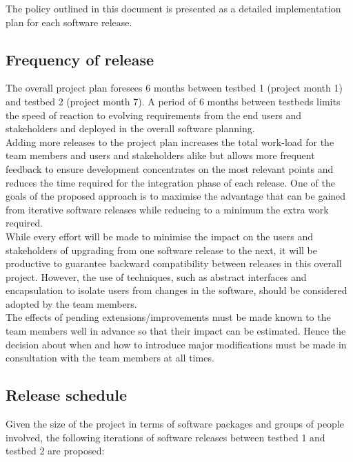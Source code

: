 \noindent The policy outlined in this document is presented as a detailed implementation plan for each software release.

\subsection{Frequency of release}

\noindent The overall project plan foresees 6 months between testbed 1 (project month 1) and testbed 2 (project month 7).  A period of 6 months between testbeds limits the speed of reaction to evolving requirements from the end users and stakeholders and deployed in the overall software planning.\\

\noindent Adding more releases to the project plan increases the total work-load for the team members and users and stakeholders alike but allows more frequent feedback to ensure development concentrates on the most relevant points and reduces the time required for the integration phase of each release. One of the goals of the proposed approach is to maximise the advantage that can be gained from iterative software releases while reducing to a minimum the extra work required.\\

\noindent While every effort will be made to minimise the impact on the users and stakeholders of upgrading from one software release to the next, it will be productive to guarantee backward compatibility between releases in this overall project. However, the use of techniques, such as abstract interfaces and encapsulation to isolate users from changes in the software, should be considered adopted by the team members. \\

\noindent The effects of pending extensions/improvements must be made known to the team members well in advance so that their impact can be estimated. Hence the decision about when and how to introduce major modifications must be made in consultation with the team members at all times.

\subsection{Release schedule}

\noindent Given the size of the project in terms of software packages and groups of people involved, the following iterations of software releases between testbed 1 and testbed 2 are proposed:

